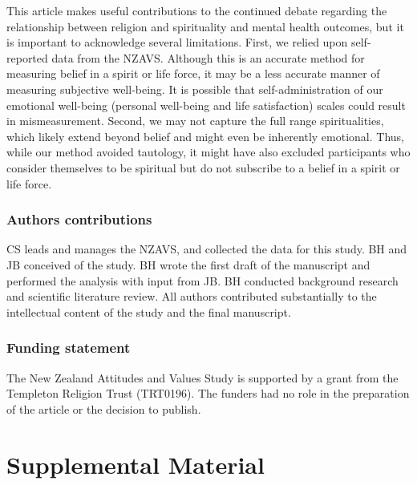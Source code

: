 \documentclass[
  english,
  man]{apa6}
\begin{document}
This article makes useful contributions to the continued debate regarding the relationship between religion and spirituality and mental health outcomes, but it is important to acknowledge several limitations. First, we relied upon self-reported data from the NZAVS. Although this is an accurate method for measuring belief in a spirit or life force, it may be a less accurate manner of measuring subjective well-being. It is possible that self-administration of our emotional well-being (personal well-being and life satisfaction) scales could result in mismeasurement. Second, we may not capture the full range spiritualities, which likely extend beyond belief and might even be inherently emotional. Thus, while our method avoided tautology, it might have also excluded participants who consider themselves to be spiritual but do not subscribe to a belief in a spirit or life force.

\hypertarget{authors-contributions}{%
\subsubsection{Authors contributions}\label{authors-contributions}}

CS leads and manages the NZAVS, and collected the data for this study. BH and JB conceived
of the study. BH wrote the first draft of the manuscript and performed the analysis with input from JB. BH conducted background research and scientific literature review. All authors contributed substantially to the intellectual content of the study and the final manuscript.

\hypertarget{funding-statement}{%
\subsubsection{Funding statement}\label{funding-statement}}

The New Zealand Attitudes and Values Study is supported by a grant from the Templeton
Religion Trust (TRT0196). The funders had no role in the preparation of the article or the
decision to publish.

\hypertarget{supplemental-material}{%
\section{Supplemental Material}\label{supplemental-material}}
\end{document}

